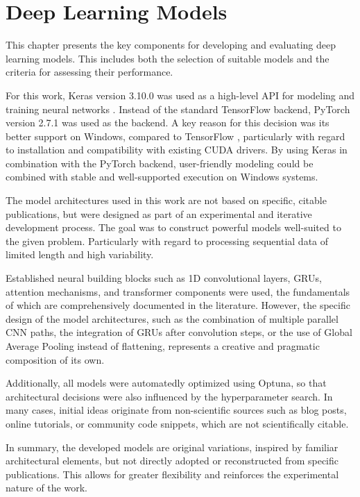 \section{Deep Learning Models}
\label{chap:dl-models}

This chapter presents the key components for developing and evaluating deep learning models.
This includes both the selection of suitable models and the criteria for assessing their performance.

For this work, Keras version 3.10.0 was used as a high-level API for modeling and training neural networks \cite{keras-home}.
Instead of the standard TensorFlow backend, PyTorch version 2.7.1 was used as the backend.
A key reason for this decision was its better support on Windows, compared to TensorFlow \cite{tf-windows}, particularly with regard to installation and compatibility with existing CUDA drivers.
By using Keras in combination with the PyTorch backend, user-friendly modeling could be combined with stable and well-supported execution on Windows systems.


The model architectures used in this work are not based on specific, citable publications, but were designed as part of an experimental and iterative development process.
The goal was to construct powerful models well-suited to the given problem.
Particularly with regard to processing sequential data of limited length and high variability.

Established neural building blocks such as 1D convolutional layers, GRUs, attention mechanisms, and transformer components were used, the fundamentals of which are comprehensively documented in the literature.
However, the specific design of the model architectures, such as the combination of multiple parallel CNN paths, the integration of GRUs after convolution steps, or the use of Global Average Pooling instead of flattening, represents a creative and pragmatic composition of its own.

Additionally, all models were automatedly optimized using Optuna, so that architectural decisions were also influenced by the hyperparameter search.
In many cases, initial ideas originate from non-scientific sources such as blog posts, online tutorials, or community code snippets, which are not scientifically citable.

In summary, the developed models are original variations, inspired by familiar architectural elements, but not directly adopted or reconstructed from specific publications.
This allows for greater flexibility and reinforces the experimental nature of the work.

